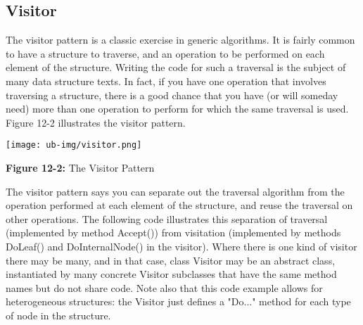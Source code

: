\subsection*{Visitor}

The visitor pattern is a classic exercise in
generic algorithms. It is fairly common to have a structure to
traverse, and an operation to be performed on each
element of the structure. Writing the code for such a traversal is the
subject of many data structure texts. In fact, if you have one
operation that involves traversing a structure, there is a good chance
that you have (or will someday need) more than one operation to perform
for which the same traversal is used. Figure 12-2 illustrates the
visitor pattern.

\bigskip

\texttt{[image: ub-img/visitor.png]}

{\sffamily\bfseries Figure 12-2:}
{\sffamily The Visitor Pattern}

\bigskip

The visitor pattern says you can separate out the traversal algorithm
from the operation performed at each element of the structure, and
reuse the traversal on other operations. The following code illustrates
this separation of traversal (implemented by method \textsf{Accept()})
from visitation (implemented by methods \textsf{DoLeaf()} and
\textsf{DoInternalNode()} in the visitor). Where there is one kind of
visitor there may be many, and in that case, class Visitor may be an
abstract class, instantiated by many concrete Visitor
subclasses that have the same method names but do not
share code. Note also that this code example allows for heterogeneous
structures: the Visitor just defines a
"Do..." method for each type of node in the
structure.


